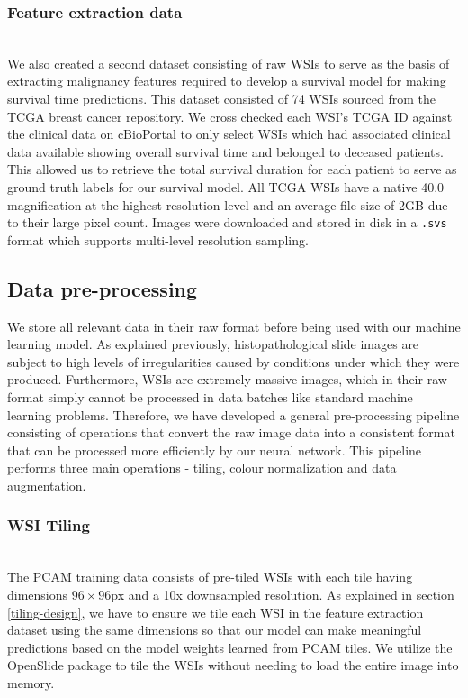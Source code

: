 \documentclass{l4proj}
\begin{document}
\subsubsection{Feature extraction data}\hfill\\
We also created a second dataset consisting of raw WSIs to serve as the basis of extracting malignancy features required to develop a survival model for making survival time predictions. This dataset consisted of 74 WSIs sourced from the TCGA breast cancer repository. We cross checked each WSI's TCGA ID against the clinical data on cBioPortal to only select WSIs which had associated clinical data available showing overall survival time and belonged to deceased patients. This allowed us to retrieve the total survival duration for each patient to serve as ground truth labels for our survival model. All TCGA WSIs have a native 40.0 magnification at the highest resolution level and an average file size of 2GB due to their large pixel count. Images were downloaded and stored in disk in a \texttt{.svs} format which supports multi-level resolution sampling.  

\subsection{Data pre-processing}
We store all relevant data in their raw format before being used with our machine learning model. As explained previously, histopathological slide images are subject to high levels of irregularities caused by conditions under which they were produced. Furthermore, WSIs are extremely massive images, which in their raw format simply cannot be processed in data batches like standard machine learning problems. Therefore, we have developed a general pre-processing pipeline consisting of  operations that convert the raw image data into a consistent format that can be processed more efficiently by our neural network. This pipeline performs three main operations - tiling, colour normalization and data augmentation. 
\\
\subsubsection{WSI Tiling}\hfill\\
The PCAM training data consists of pre-tiled WSIs with each tile having dimensions \(96 \times 96\)px and a 10x downsampled resolution. As explained in section \ref{tiling-design}, we have to ensure we tile each WSI in the feature extraction dataset using the same dimensions so that our model can make meaningful predictions based on the model weights learned from PCAM tiles. We utilize the OpenSlide package to tile the WSIs without needing to load the entire image into memory. 
\end{document}
